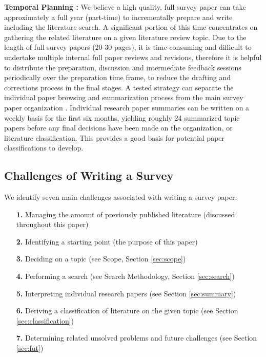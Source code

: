 \textbf{Temporal Planning \cons :} We believe a high quality, full survey paper can take approximately a full year (part-time) to incrementally prepare and write including the literature search. A significant portion of this time concentrates on gathering the related literature on a given literature review topic. Due to the length of full survey papers (20-30 pages), it is time-consuming and difficult to undertake multiple internal full paper reviews and revisions, therefore it is helpful to distribute the preparation, discussion and intermediate feedback sessions periodically over the preparation time frame, to reduce the drafting and corrections process in the final stages. A tested strategy can separate the individual paper browsing and summarization process from the main survey paper organization \cite{laramee2010write}. Individual research paper summaries can be written on a weekly basis for the first six months, yielding roughly 24 summarized topic papers before any final decisions have been made on the organization, or literature classification. This provides a good basis for potential paper classifications to develop.

\subsection{Challenges of Writing a Survey} \label{sec:challenges}
We identify seven main challenges associated with writing a survey paper. 
\begin{itemize}[labelindent=0em, labelsep=0.2cm, leftmargin=*]
\item[\textbf{1.}] Managing the amount of previously published literature (discussed throughout this paper)
\item[\textbf{2.}] Identifying a starting point (the purpose of this paper)
\item[\textbf{3.}] Deciding on a topic (see Scope, Section \ref{sec:scope})
\item[\textbf{4.}] Performing a search (see Search Methodology, Section \ref{sec:search})
\item[\textbf{5.}] Interpreting individual research papers (see Section \ref{sec:summary})
\item[\textbf{6.}] Deriving a classification of literature on the given topic (see Section \ref{sec:classification})
\item[\textbf{7.}] Determining related unsolved problems and future challenges (see Section \ref{sec:fut})
\end{itemize}

